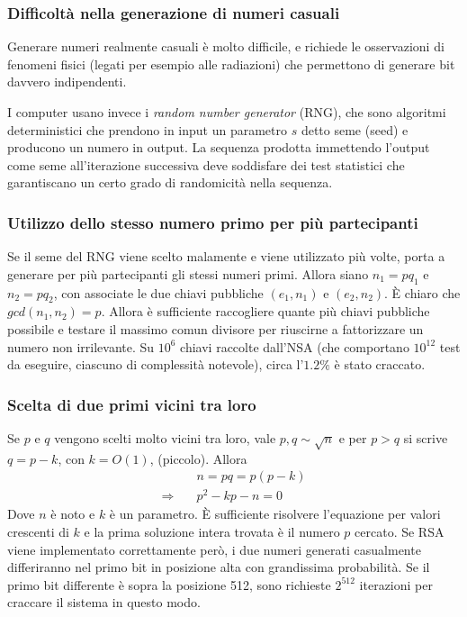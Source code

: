 \subsubsection{Difficoltà nella generazione di numeri casuali}

Generare numeri realmente casuali è molto difficile, e richiede le osservazioni di fenomeni fisici (legati per esempio alle radiazioni) che permettono di generare bit davvero indipendenti.

I computer usano invece i \emph{random number generator} (RNG), che sono algoritmi deterministici che prendono in input un parametro $s$ detto seme (seed) e producono un numero in output. La sequenza prodotta immettendo l'output come seme all'iterazione successiva deve soddisfare dei test statistici che garantiscano un certo grado di randomicità nella sequenza.

\subsubsection{Utilizzo dello stesso numero primo per più partecipanti}

Se il seme del RNG viene scelto malamente e viene utilizzato più volte, porta a generare per più partecipanti gli stessi numeri primi. Allora siano $
n_1 = p q_1
$ e $
n_2 = p q_2
$, con associate le due chiavi pubbliche $
\left( e_1, n_1 \right)
$ e $
\left( e_2, n_2 \right)
$. È chiaro che $
gcd(n_1, n_2) = p
$.
Allora è sufficiente raccogliere quante più chiavi pubbliche possibile e testare il massimo comun divisore per riuscirne a fattorizzare un numero non irrilevante. Su $10^6$ chiavi raccolte dall'NSA (che comportano $10^{12}$ test da eseguire, ciascuno di complessità notevole), circa l'$1.2\%$ è stato craccato.

\subsubsection{Scelta di due primi vicini tra loro}

Se $p$ e $q$ vengono scelti molto vicini tra loro, vale $
p,q \sim \sqrt{n}
$ e per $
p > q
$ si scrive $
q = p - k
$, con $
k = O \left( 1 \right)
$, (piccolo).
Allora
\begin{align*}
    &
    n
    =
    pq
    =
    p \left( p-k \right)
    \\
    \Rightarrow
    \quad
    &
    p^2 - kp - n = 0
\end{align*}
Dove $n$ è noto e $k$ è un parametro.
È sufficiente risolvere l'equazione per valori crescenti di $k$ e la prima soluzione intera trovata è il numero $p$ cercato.
Se RSA viene implementato correttamente però, i due numeri generati casualmente differiranno nel primo bit in posizione alta con grandissima probabilità. Se il primo bit differente è sopra la posizione 512, sono richieste $2^{512}$ iterazioni per craccare il sistema in questo modo.

